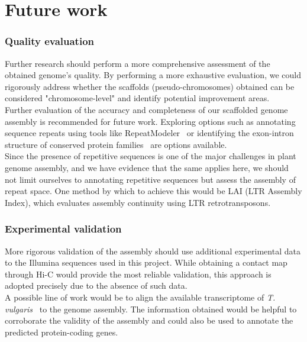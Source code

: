 \chapter{Future work}\label{cha:future}

\subsection*{Quality evaluation}

Further research should perform a more comprehensive assessment of the obtained genome's quality. By performing a more exhaustive evaluation, we could rigorously address whether the scaffolds (pseudo-chromosomes) obtained can be considered "chromosome-level" and identify potential improvement areas.\\

Further evaluation of the accuracy and completeness of our scaffolded genome assembly is recommended for future work. Exploring options such as annotating sequence repeats using tools like RepeatModeler~\cite{flynnRepeatModeler2AutomatedGenomic2019} or identifying the exon-intron structure of conserved protein families~\cite{parraCEGMAPipelineAccurately2007} are options available. \\

Since the presence of repetitive sequences is one of the major challenges in plant genome assembly, and we have evidence that the same applies here, we should not limit ourselves to annotating repetitive sequences but assess the assembly of repeat space. One method by which to achieve this would be LAI (LTR Assembly Index), which evaluates assembly continuity using LTR retrotransposons.~\cite{ouAssessingGenomeAssembly2018}\\

\subsection*{Experimental validation}

More rigorous validation of the assembly should use additional experimental data to the Illumina sequences used in this project. While obtaining a contact map through \ac{Hi-C} would provide the most reliable validation, this approach is adopted precisely due to the absence of such data. \\

A possible line of work would be to align the available transcriptome of \textit{T. vulgaris}~\cite{bataillonGenotypePhenotypeGenetic2022} to the genome assembly. The information obtained would be helpful to corroborate the validity of the assembly and could also be used to annotate the predicted protein-coding genes.~\cite{sunChromosomelevelAssemblyAnalysis2022,haasImprovingArabidopsisGenome2003} \\

